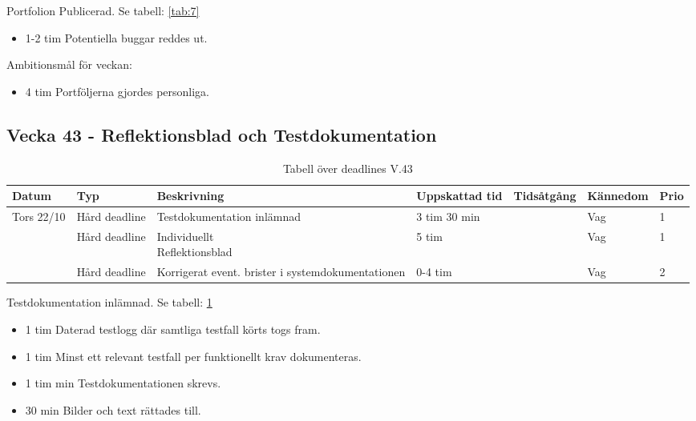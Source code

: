 \documentclass{TDP003mall}
\begin{document}
Portfolion Publicerad. Se tabell: \ref{tab:7}
\begin{itemize}
\item 1-2 tim Potentiella buggar reddes ut.
  \end{itemize}

Ambitionsmål för veckan:
\begin{itemize}
\item 4 tim Portföljerna gjordes personliga.
\end{itemize}



\subsection*{Vecka 43 - Reflektionsblad och Testdokumentation}
\begin{table}[h!]
\caption{Tabell över deadlines V.43\label{tab:8}}  
\begin{tabularx}{\linewidth}{|l|l|X|l|l|l|l|}
  \hline
  Datum      & Typ           & Beskrivning                                       & Uppskattad tid & Tidsåtgång & Kännedom & Prio \\ [0.5ex]
  \hline                                                                             
  Tors 22/10 & Hård deadline & Testdokumentation inlämnad                        & 3 tim 30 min   &            & Vag      & 1\\
  \hline                                                                             
             & Hård deadline & \makecell[tl]{Individuellt \\ Reflektionsblad}    & 5 tim          &            & Vag      & 1\\
  \hline                                                                             
             & Hård deadline & Korrigerat event. brister i systemdokumentationen & 0-4 tim        &            & Vag      & 2\\
  \hline
\end{tabularx}      
      \end{table}

Testdokumentation inlämnad. Se tabell: \ref{tab:8}
\begin{itemize}
  \item 1 tim Daterad testlogg där samtliga testfall körts togs fram.
  \item 1 tim Minst ett relevant testfall per funktionellt krav dokumenteras.
  \item 1 tim min Testdokumentationen skrevs.
  \item 30 min Bilder och text rättades till.
\end{itemize}
\end{document}
